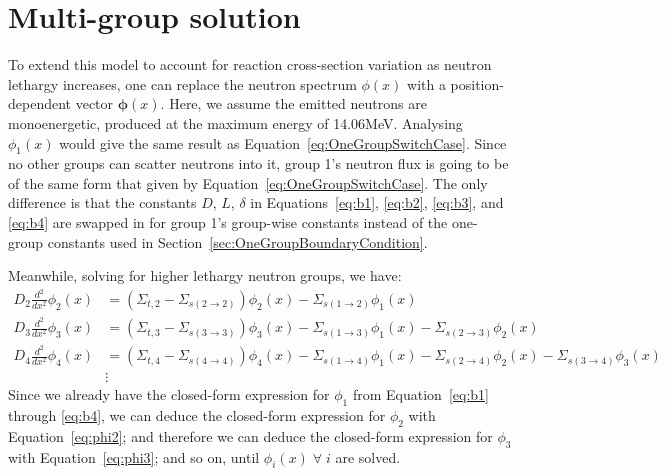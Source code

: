 \documentclass[a4paper, 12pt]{article}
\newcommand{\ve}[1]{\boldsymbol{#1}}
\begin{document}
\section{Multi-group solution}
To extend this model to account for reaction cross-section variation as neutron lethargy increases, one can replace the neutron spectrum $\phi(x)$ with a position-dependent vector $\ve{\phi}(x)$.
Here, we assume the emitted neutrons are monoenergetic, produced at the maximum energy of 14.06MeV.
Analysing $\phi_1(x)$ would give the same result as Equation~\ref{eq:OneGroupSwitchCase}.
Since no other groups can scatter neutrons into it, group 1's neutron flux is going to be of the same form that given by Equation~\ref{eq:OneGroupSwitchCase}. The only difference is that the constants $D$, $L$, $\delta$ in Equations~\ref{eq:b1}, \ref{eq:b2}, \ref{eq:b3}, and \ref{eq:b4} are swapped in for group 1's group-wise constants instead of the one-group constants used in Section~\ref{sec:OneGroupBoundaryCondition}.

Meanwhile, solving for higher lethargy neutron groups, we have:
\begin{align}
    D_2 \frac{d^2}{dx^2}\phi_2(x) &= (\Sigma_{t,2} - \Sigma_{s(2\rightarrow 2)}) \phi_2(x) - \Sigma_{s(1\rightarrow 2)} \phi_1(x)\label{eq:phi2}\\
    D_3 \frac{d^2}{dx^2}\phi_3(x) &= (\Sigma_{t,3} - \Sigma_{s(3\rightarrow 3)}) \phi_3(x) - \Sigma_{s(1\rightarrow 3)} \phi_1(x) - \Sigma_{s(2\rightarrow 3)} \phi_2(x)\label{eq:phi3}\\
    D_4 \frac{d^2}{dx^2}\phi_4(x) &= (\Sigma_{t,4} - \Sigma_{s(4\rightarrow 4)}) \phi_4(x) - \Sigma_{s(1\rightarrow 4)} \phi_1(x) - \Sigma_{s(2\rightarrow 4)} \phi_2(x) - \Sigma_{s(3\rightarrow 4)} \phi_3(x)\label{eq:phi4}\\
    &\vdots \nonumber
\end{align}
Since we already have the closed-form expression for $\phi_1$ from Equation~\ref{eq:b1} through \ref{eq:b4}, we can deduce the closed-form expression for $\phi_2$ with Equation~\ref{eq:phi2}; and therefore we can deduce the closed-form expression for $\phi_3$ with Equation~\ref{eq:phi3}; and so on, until $\phi_i(x)\; \forall\; i$  are solved.
\end{document}
